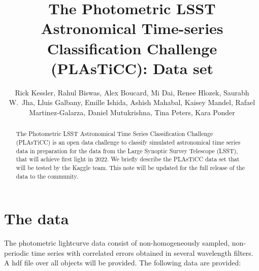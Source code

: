 \documentclass[\docopts]{\docclass}
\author{Rick Kessler,  Rahul Biswas, Alex Boucard, Mi Dai, Renee Hlozek,
Saurabh W.~Jha, Lluis Galbany, Emille Ishida, Ashish Mahabal, Kaisey Mandel, Rafael Martinez-Galarza, Daniel Mutukrishna, Tina Peters, Kara Ponder}
\begin{document}
\title{The Photometric LSST Astronomical Time-series Classification Challenge (PLAsTiCC): Data set}


\begin{abstract}
The Photometric LSST Astronomical Time Series Classification Challenge (PLAsTiCC) is an open data challenge to classify simulated astronomical time series data in preparation for the data from the Large Synoptic Survey Telescope (LSST), that will achieve first light in 2022. We briefly describe the PLAsTiCC data set that will be tested by the Kaggle team. This note will be updated for the full release of the data to the community.

\end{abstract}

\dockeys{}

\maketitlepost


\section{The data}
\label{sec:thedata}

The photometric lightcurve data consist of non-homogeneously sampled, non-periodic time series with correlated errors obtained in several wavelength filters.
A hdf file over all objects will be provided. The following data are provided:
\end{document}
